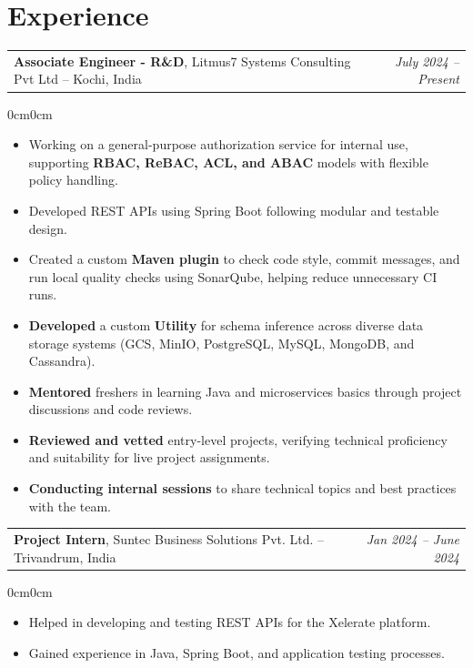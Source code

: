 \documentclass[10pt, letterpaper]{article}
\makeatletter
\newenvironment{highlights}{
\begin{itemize}[topsep=0.08cm,parsep=0.08cm,partopsep=0pt,itemsep=0pt,leftmargin=10pt]}{\end{itemize}}
\newenvironment{onecolentry}{\begin{adjustwidth}{0cm}{0cm}}{\end{adjustwidth}}
\newcommand{\twocolentry}[2]{%
  \noindent\begin{tabular*}{\textwidth}{@{}p{0.70\textwidth}@{\extracolsep{\fill}}r@{}}
  #2 & \textit{#1} \\
  \end{tabular*}\par
}
\makeatother
\begin{document}
\section{Experience}
\twocolentry{July 2024 – Present}{\textbf{Associate Engineer - R\&D}, Litmus7 Systems Consulting Pvt Ltd -- Kochi, India}
\vspace{0.05cm}
\begin{onecolentry}
\begin{highlights}
    \item Working on a general-purpose authorization service for internal use, supporting \textbf{RBAC, ReBAC, ACL, and ABAC} models with flexible policy handling.
    \item Developed REST APIs using Spring Boot following modular and testable design.
    \item Created a custom \textbf{Maven plugin} to check code style, commit messages, and run local quality checks using SonarQube, helping reduce unnecessary CI runs.
    \item \textbf{Developed} a custom \textbf{Utility} for schema inference across diverse data storage systems (GCS, MinIO, PostgreSQL, MySQL, MongoDB, and Cassandra).
    \item \textbf{Mentored} freshers in learning Java and microservices basics through project discussions and code reviews.
    \item \textbf{Reviewed and vetted} entry-level projects, verifying technical proficiency and suitability for live project assignments.
    \item \textbf{Conducting internal sessions} to share technical topics and best practices with the team.
\end{highlights}
\end{onecolentry}

\vspace{0.12cm}
\twocolentry{Jan 2024 – June 2024}{\textbf{Project Intern}, Suntec Business Solutions Pvt. Ltd. -- Trivandrum, India}
\vspace{0.05cm}
\begin{onecolentry}
\begin{highlights}
    \item Helped in developing and testing REST APIs for the Xelerate platform.
    \item Gained experience in Java, Spring Boot, and application testing processes.
\end{highlights}
\end{onecolentry}
\end{document}
